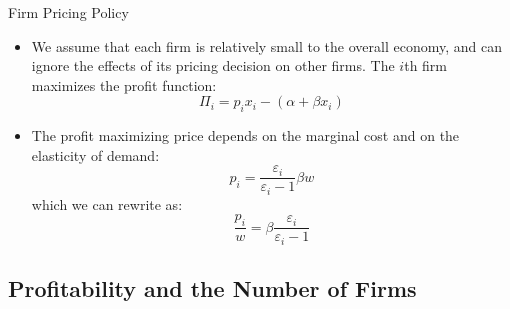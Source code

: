 \documentclass[aspectratio=169]{beamer}
\begin{document}
\begin{frame}{Firm Pricing Policy}

\begin{itemize}
    \item<1-> We assume that each firm is relatively small to the overall economy, and can ignore the effects of its pricing decision on other firms.  The $ i $th firm maximizes the profit function:
    \begin{equation}
        \Pi_{i} = p_{i} x_{i} - \left( \alpha + \beta x_{i} \right)
        \label{eq:profitfunction}
    \end{equation}
    \item<2-> The profit maximizing price depends on the marginal cost and on the elasticity of demand:
    \begin{equation*}
        p_{i} = \frac{\varepsilon_{i}}{\varepsilon_{i} - 1} \beta w
    \end{equation*}
    which we can rewrite as:
    \begin{equation}
        \frac{p_{i}}{w} = \beta \frac{\varepsilon_{i}}{\varepsilon_{i} - 1}
        \label{eq:optimalprice}
    \end{equation}
\end{itemize}
    
\end{frame}


\subsection{Profitability and the Number of Firms}

\end{document}
